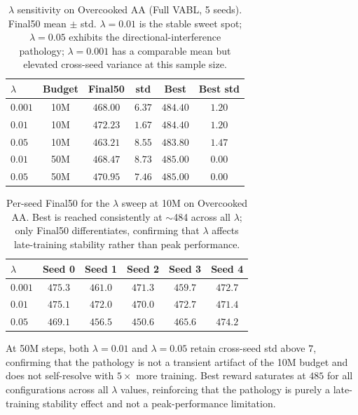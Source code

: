 \documentclass{article}
\theoremstyle{plain}
\theoremstyle{definition}
\theoremstyle{remark}
\begin{document}
\begin{table}[H]
\centering
\small
\caption{$\lambda$ sensitivity on Overcooked AA (Full VABL, 5 seeds).
Final50 mean $\pm$ std. $\lambda{=}0.01$ is the stable sweet spot;
$\lambda{=}0.05$ exhibits the directional-interference pathology;
$\lambda{=}0.001$ has a comparable mean but elevated cross-seed
variance at this sample size.}
\label{tab:lambda_sweep}
\begin{tabular}{lccccc}
\toprule
$\lambda$ & Budget & Final50 & std & Best & Best std \\
\midrule
$0.001$ & 10M & $468.00$ & $6.37$ & $484.40$ & $1.20$ \\
$0.01$  & 10M & \textbf{$472.23$} & \textbf{$1.67$} & $484.40$ & $1.20$ \\
$0.05$  & 10M & $463.21$ & $8.55$ & $483.80$ & $1.47$ \\
\midrule
$0.01$  & 50M & $468.47$ & $8.73$ & $485.00$ & $0.00$ \\
$0.05$  & 50M & $470.95$ & $7.46$ & $485.00$ & $0.00$ \\
\bottomrule
\end{tabular}
\end{table}

\begin{table}[H]
\centering
\small
\caption{Per-seed Final50 for the $\lambda$ sweep at 10M on Overcooked
AA. Best is reached consistently at $\sim$484 across all $\lambda$;
only Final50 differentiates, confirming that $\lambda$ affects
late-training stability rather than peak performance.}
\label{tab:lambda_per_seed}
\begin{tabular}{lccccc}
\toprule
$\lambda$ & Seed 0 & Seed 1 & Seed 2 & Seed 3 & Seed 4 \\
\midrule
$0.001$ & $475.3$ & $461.0$ & $471.3$ & $459.7$ & $472.7$ \\
$0.01$  & $475.1$ & $472.0$ & $470.0$ & $472.7$ & $471.4$ \\
$0.05$  & $469.1$ & $456.5$ & $450.6$ & $465.6$ & $474.2$ \\
\bottomrule
\end{tabular}
\end{table}

At 50M steps, both $\lambda{=}0.01$ and $\lambda{=}0.05$ retain
cross-seed std above $7$, confirming that the pathology is not a
transient artifact of the 10M budget and does not self-resolve with
$5\times$ more training. Best reward saturates at $485$ for all
configurations across all $\lambda$ values, reinforcing that the
pathology is purely a late-training stability effect and not a
peak-performance limitation.
\end{document}
